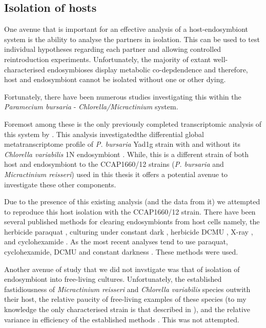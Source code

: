 
\subsection{Isolation of hosts}

One avenue that is important for an effective analysis of a host-endosymbiont
system is the ability to analyse the partners in isolation.  This can be used
to test individual hypotheses regarding each partner and allowing controlled
reintroduction experiments. 
Unfortunately,
the majority of extant well-characterised endosymbioses display metabolic co-depdendence
and therefore, host and endosymbiont cannot be isolated without one or other dying. 

Fortunately, there have been numerous studies investigating this within the \textit{Paramecium bursaria}
- \textit{Chlorella/Micractinium} system.  %

Foremost among these is the only previously completed transcriptomic analysis of this system by \citep{Kodama2014c}.
 This analysis investigatedthe differential global metatranscriptome profile of \textit{P. bursaria} Yad1g strain with 
 and without its \textit{Chlorella variabilis} 1N endosymbiont 
\citep{Kodama2014c}.   While, this is a different strain of both host and endosymbiont to the CCAP1660/12 strains (\textit{P. bursaria} and \textit{Micractinium reisseri}) 
used in this thesis it offers a potential avenue to investigate these other components.  

Due to the presence of this existing analysis (and the data from it) we attempted to reproduce this
host isolation with the CCAP1660/12 strain. There have been several published methods
for clearing endosymbionts from host cells namely, the herbicide paraquat \citep{Hosoya1995a}, 
culturing under constant dark \citep{Karakashian1963}, herbicide DCMU \citep{Reisser1976},
X-ray \citep{Wichterman1948}, and cyclohexamide \citep{Weis1984,Kodama2007}.
As the most recent analyses tend to use paraquat, cyclohexamide, DCMU
and constant darkness \citep{Kodama2009a}.  These methods were used. 


Another avenue of study that we did not invstigate was that of
isolation of endosymbiont into free-living cultures. 
Unfortunately, the established fastidiousness of \textit{Micractinium reisseri} 
and \textit{Chlorella variabilis} species outwith their host, the relative
paucity of free-living examples of these species (to my knowledge
the only characterised strain is that described in \citep{Abou-Shanab2014}), 
and the relative variance in efficiency of the established methods
 \citep{Achilles-Day2013a}. This was not attempted. 



